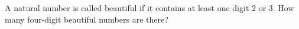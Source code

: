 A natural number is called beautiful if it contains at least one digit $2$ or $3$. How many four-digit beautiful numbers are there?
